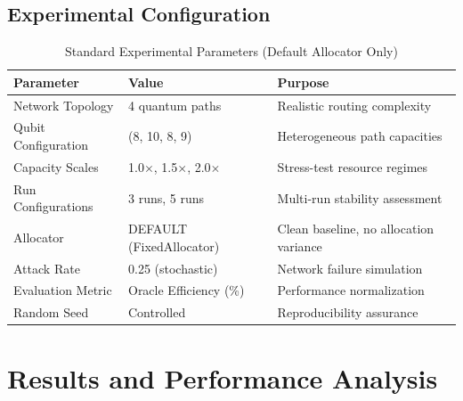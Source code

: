 \documentclass[12pt,a4paper]{article}
\begin{document}
\subsection{Experimental Configuration}

\begin{table}[H]
\centering
\caption{Standard Experimental Parameters (Default Allocator Only)}
\begin{tabular}{@{}lll@{}}
\toprule
\textbf{Parameter} & \textbf{Value} & \textbf{Purpose} \\
\midrule
Network Topology & 4 quantum paths & Realistic routing complexity \\
Qubit Configuration & (8, 10, 8, 9) & Heterogeneous path capacities \\
Capacity Scales & 1.0$\times$, 1.5$\times$, 2.0$\times$ & Stress-test resource regimes \\
Run Configurations & 3 runs, 5 runs & Multi-run stability assessment \\
Allocator & DEFAULT (FixedAllocator) & Clean baseline, no allocation variance \\
Attack Rate & 0.25 (stochastic) & Network failure simulation \\
Evaluation Metric & Oracle Efficiency (\%) & Performance normalization \\
Random Seed & Controlled & Reproducibility assurance \\
\bottomrule
\end{tabular}
\end{table}

\section{Results and Performance Analysis}
\end{document}
